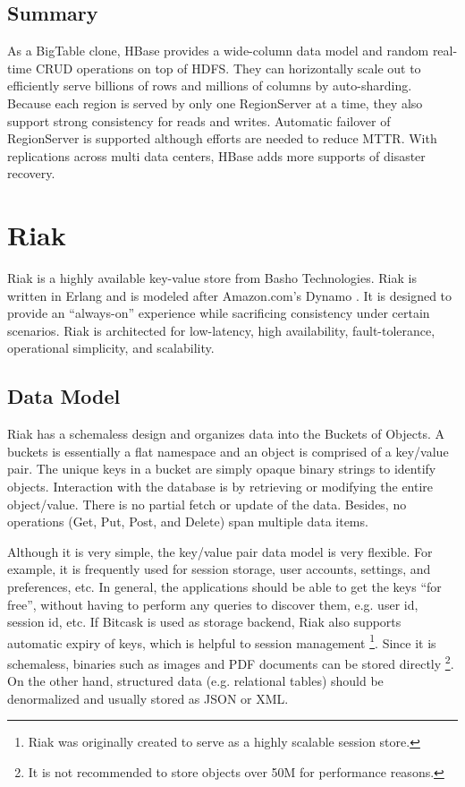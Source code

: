 \documentclass[12pt]{book}
\begin{document}
\subsection{Summary}
As a BigTable clone, HBase provides a wide-column data model and random real-time CRUD operations on top of HDFS. They can horizontally scale out to efficiently serve billions of rows and millions of columns by auto-sharding. Because each region is served by only one RegionServer at a time, they also support strong consistency for reads and writes. Automatic failover of RegionServer is supported although efforts are needed to reduce MTTR. With replications across multi data centers, HBase adds more supports of disaster recovery.

\section[Riak]
{Riak}
Riak \cite{Riak} is a highly available key-value store from Basho Technologies. Riak is written in Erlang and is modeled after Amazon.com's Dynamo \cite{DeCandia:2007:DAH}. It is designed to provide an ``always-on'' experience while sacrificing consistency under certain scenarios. Riak is architected for low-latency, high availability, fault-tolerance, operational simplicity, and scalability.

\subsection{Data Model}

Riak has a schemaless design and organizes data into the Buckets of Objects. A buckets is essentially a flat namespace and an object is comprised of a key/value pair. The unique keys in a bucket are simply opaque binary strings to identify objects. Interaction with the database is by retrieving or modifying the entire object/value. There is no partial fetch or update of the data. Besides, no operations (Get, Put, Post, and Delete) span multiple data items.

Although it is very simple, the key/value pair data model is very flexible. For example, it is frequently used for session storage, user accounts, settings, and preferences, etc. In general, the applications should be able to get the keys ``for free'', without having to perform any queries to discover them, e.g. user id, session id, etc. If Bitcask is used as storage backend, Riak also supports automatic expiry of keys, which is helpful to session management \footnote{Riak was originally created to serve as a highly scalable session store.}. Since it is schemaless, binaries such as images and PDF documents can be stored directly \footnote{It is not recommended to store objects over 50M for performance reasons.}. On the other hand, structured data (e.g. relational tables) should be denormalized and usually stored as JSON or XML.
\end{document}
